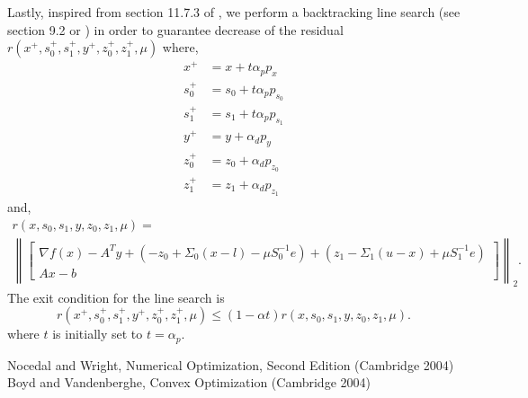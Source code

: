\documentclass{article}
\begin{document}
Lastly, inspired from section 11.7.3 of \cite{BL04}, 
    we perform a backtracking line search (see section 9.2 or \cite{BL04})
    in order to guarantee decrease of the residual
    $r(x^+, s_0^+, s_1^+, y^+, z_0^+, z_1^+, \mu)$ where,
    \begin{align*}
    x^+ &= x + t \alpha_p p_x \\
    s_0^+ &= s_0+t \alpha_p p_{s_0} \\
    s_1^+ &= s_1+t \alpha_p p_{s_1} \\
    y^+ &= y +\alpha_d p_y \\
    z_0^+ &= z_0 + \alpha_d p_{z_0} \\
    z_1^+ &= z_1+\alpha_d p_{z_1} 
    \end{align*}
    and,
\begin{multline}
    r(x, s_0, s_1, y, z_0, z_1, \mu) = \\
\left\|
\begin{bmatrix}
    \nabla f(x) - A^T y + (-z_0 + \Sigma_0 (x - l) - \mu S_0^{-1} e) 
                        + (z_1 - \Sigma_1 (u - x) + \mu S_1^{-1} e) \\
    A x - b
\end{bmatrix}\right\|_2.
\end{multline}
The exit condition for the line search is 
    \begin{equation} r(x^+, s_0^+, s_1^+, y^+, z_0^+, z_1^+, \mu) \le
    (1-\alpha t) r(x, s_0, s_1, y, z_0, z_1, \mu).
    \end{equation}
where $t$ is initially set to $t = \alpha_p$.






\begin{thebibliography}{99}
 Nocedal and Wright, 
    Numerical Optimization, Second Edition (Cambridge 2004)
 Boyd and Vandenberghe,
    Convex Optimization (Cambridge 2004)
\end{thebibliography}
\end{document}
